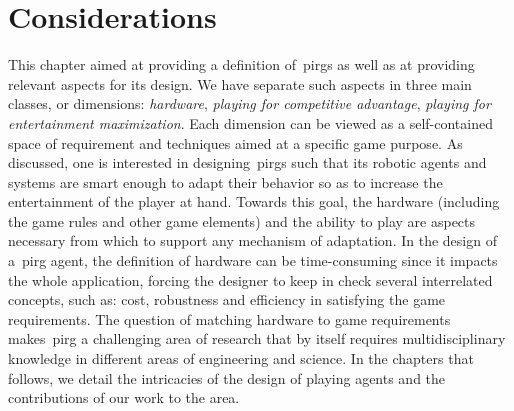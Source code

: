 \section{Considerations}
This chapter aimed at providing a definition of~\glspl{pirg} as well as at providing relevant aspects for its design. We have separate such aspects in three main classes, or dimensions: \textit{hardware}, \textit{playing for competitive advantage}, \textit{playing for entertainment maximization}. Each dimension can be viewed as a self-contained space of requirement and techniques aimed at a specific game purpose. As discussed, one is interested in designing~\glspl{pirg} such that its robotic agents and systems are smart enough to adapt their behavior so as to increase the entertainment of the player at hand. Towards this goal, the hardware (including the game rules and other game elements) and the ability to play are aspects necessary from which to support any mechanism of adaptation. In the design of a~\gls{pirg} agent, the definition of hardware can be time-consuming since it impacts the whole application, forcing the designer to keep in check several interrelated concepts, such as: cost, robustness and efficiency in satisfying the game requirements. The question of matching hardware to game requirements makes~\gls{pirg} a challenging area of research that by itself requires multidisciplinary knowledge in different areas of engineering and science. In the chapters that follows, we detail the intricacies of the design of playing agents and the contributions of our work to the area.